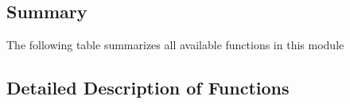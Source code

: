 \documentclass[letterpaper,10pt,english]{sphinxmanual}
\begin{document}
\subsection{Summary}
\label{\detokenize{dnpResults:summary}}
The following table summarizes all available functions in this module


\subsection{Detailed Description of Functions}
\label{\detokenize{dnpResults:module-dnpLab.dnpResults}}\label{\detokenize{dnpResults:detailed-description-of-functions}}
\end{document}
